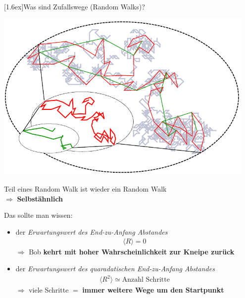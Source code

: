 \documentclass[final]{beamer}
\newlength{\columnheight}
\newlength{\marginw}
\newlength{\tw}
\newlength{\colsep}
\newlength{\colw}
\newenvironment{myTwoColPoster}{%
  \begin{minipage}[t]{\textwidth}%
    \hspace*{\marginw}%
    \hspace*{9.5bp}%
    \begin{minipage}[t]{\tw}}%
  {\end{minipage}%
   \hspace*{\marginw}%
   \end{minipage}}
\newenvironment{myCol}%
    {\begin{minipage}[t][\columnheight][t]{\colw}}%
    {\end{minipage}}
\newenvironment{textblock}[1]%
    {\begin{block}{\rule[-0.6ex]{0pt}{2.4ex}\raisebox{-0.25ex}[1.6ex]{#1}}%
     \vspace*{5mm}}%
    {\vspace*{5mm}\end{block}}
\begin{document}
\begin{frame}[t]{}
\begin{myTwoColPoster}
\begin{myCol}
\begin{textblock}{Was sind Zufallswege (Random Walks)? }
\begin{center}
    \end{center}
    \begin{minipage}[c]{0.7\textwidth}
      \includegraphics[width=0.95\textwidth]{fig/randomWalkSelfsimiliar}
    \end{minipage}
    \begin{minipage}[c]{0.29\textwidth}
      Teil eines Random Walk ist wieder ein Random Walk\\
      \textcolor{IPForange}{$\Rightarrow$ \textbf{Selbstähnlich}}

    \end{minipage}
    Das sollte man wissen:
    \begin{itemize} \setlength\itemsep{1.1em} \Large
      \item der \textit{Erwartungswert des End-zu-Anfang Abstandes} 
      \begin{align*}
        \langle R \rangle=0
      \end{align*}
      $\Rightarrow$ Bob \textbf{kehrt mit hoher Wahrscheinlichkeit zur Kneipe zurück}
      \item der \textit{Erwartungswert des quaradatischen End-zu-Anfang Abstandes} 
      \begin{align*}
        \langle R^2 \rangle \simeq \text{Anzahl Schritte}
      \end{align*}$\Rightarrow$ viele Schritte $=$ \textbf{immer weitere Wege um den Startpunkt}
    \end{itemize}
  \end{textblock}

  

\end{myCol}
\hfill
\begin{myCol}
  

\end{myCol}
\end{myTwoColPoster}
\end{frame}
\end{document}
